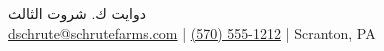 \begin{center}
	{\Huge {دوايت ك. شروت الثالث}}\\
	\foreignlanguage{english}{\href{mailto:dschrute@schrutefarms.com}{dschrute@schrutefarms.com} | \href{tel:(570) 555-1212}{(570) 555-1212} | Scranton, PA\\}
\end{center}